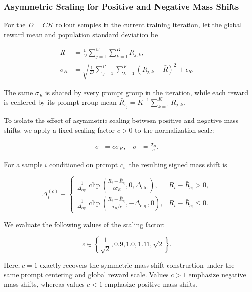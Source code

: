 \documentclass{article} %
\begin{document}
\subsubsection{Asymmetric Scaling for Positive and Negative Mass Shifts}

For the $D=CK$ rollout samples in the current training iteration, let the
global reward mean and population standard deviation be

\begin{align}
\bar R
&=
\frac{1}{D}
\sum_{j=1}^{C}\sum_{k=1}^{K}R_{j,k},\\
\sigma_R
&=
\sqrt{
\frac{1}{D}
\sum_{j=1}^{C}\sum_{k=1}^{K}
(R_{j,k}-\bar R)^2
}
+\epsilon_R.
\end{align}

The same $\sigma_R$ is shared by every prompt group in the iteration, while
each reward is centered by its prompt-group mean
$\bar R_{c_j}=K^{-1}\sum_{k=1}^{K}R_{j,k}$.

To isolate the effect of asymmetric scaling between positive and negative mass shifts, we apply a fixed scaling factor $c>0$ to the normalization scale:

\begin{align}
\sigma_+ = c\sigma_R, \quad
\sigma_- = \frac{\sigma_R}{c}.
\end{align}

For a sample $i$ conditioned on prompt $c_i$, the resulting signed mass shift
is

\begin{equation}
\Delta_i^{(c)}=
\begin{cases}
\displaystyle
\frac{1}{\Delta_{\mathrm{clip}}}
\operatorname{clip}
\left(
\frac{R_i-\bar R_{c_i}}{c\sigma_R},
0,
\Delta_{\mathrm{clip}}
\right),
& R_i-\bar R_{c_i}>0,\\[10pt]
\displaystyle
\frac{1}{\Delta_{\mathrm{clip}}}
\operatorname{clip}
\left(
\frac{R_i-\bar R_{c_i}}{\sigma_R/c},
-\Delta_{\mathrm{clip}},
0
\right),
& R_i-\bar R_{c_i}\le 0.
\end{cases}
\end{equation}

We evaluate the following values of the scaling factor:

\begin{equation}
c \in
\left\{
\frac{1}{\sqrt{2}},
0.9,
1.0,
1.11,
\sqrt{2}
\right\}.
\end{equation}

Here, $c=1$ exactly recovers the symmetric mass-shift construction under the
same prompt centering and global reward scale. Values $c>1$ emphasize negative
mass shifts, whereas values $c<1$ emphasize positive mass shifts.
\end{document}
